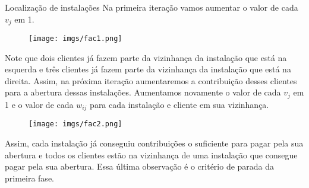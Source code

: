 \documentclass[final]{beamer}
\begin{document}
\begin{frame}[t]
\begin{columns}[t]
\begin{column}{0.47\paperwidth}
\begin{block}{Localização de instalações}
      Na primeira iteração vamos aumentar o valor de cada $v_j$ em 1.
      \begin{figure}
        \texttt{[image: imgs/fac1.png]}
      \end{figure}
      Note que dois clientes já fazem parte da vizinhança da instalação que está na esquerda e três clientes já fazem parte da vizinhança da instalação que está na direita. Assim, na próxima iteração aumentaremos a contribuição desses clientes para a abertura dessas instalações. Aumentamos novamente o valor de cada $v_j$ em 1 e o valor de cada $w_{ij}$ para cada instalação e cliente em sua vizinhança.
      
      \begin{figure}
        \texttt{[image: imgs/fac2.png]}
      \end{figure}
      Assim, cada instalação já conseguiu contribuições o suficiente para pagar pela sua abertura e todos os clientes estão na vizinhança de uma instalação que consegue pagar pela sua abertura. Essa última observação é o critério de parada da primeira fase.
    \end{block}
    \end{column}
\end{columns}

\end{frame}
\end{document}
